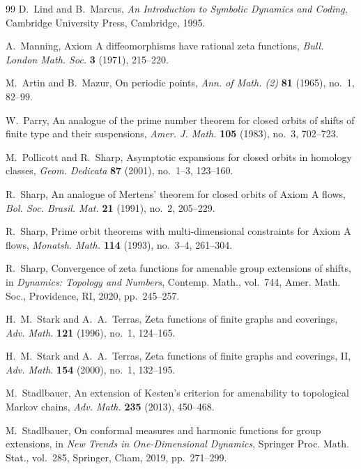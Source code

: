 \documentclass[11pt,a4paper]{amsart}
\theoremstyle{plain}
\theoremstyle{definition}
\theoremstyle{remark}
\begin{document}
\begin{thebibliography}{99}
D.~Lind and B.~Marcus,
\textit{An Introduction to Symbolic Dynamics and Coding},
Cambridge University Press, Cambridge, 1995.

A.~Manning,
Axiom {A} diffeomorphisms have rational zeta functions,
\textit{Bull. London Math. Soc.} \textbf{3} (1971), 215--220.

M.~Artin and B.~Mazur,
On periodic points,
\textit{Ann. of Math. (2)} \textbf{81} (1965), no.~1, 82--99.

W.~Parry,
An analogue of the prime number theorem for closed orbits of shifts of
finite type and their suspensions,
\textit{Amer. J. Math.} \textbf{105} (1983), no.~3, 702--723.

M.~Pollicott and R.~Sharp,
Asymptotic expansions for closed orbits in homology classes,
\textit{Geom. Dedicata} \textbf{87} (2001), no.~1--3, 123--160.

R.~Sharp,
An analogue of {M}ertens' theorem for closed orbits of {A}xiom {A} flows,
\textit{Bol. Soc. Brasil. Mat.} \textbf{21} (1991), no.~2, 205--229.

R.~Sharp,
Prime orbit theorems with multi-dimensional constraints for {A}xiom {A} flows,
\textit{Monatsh. Math.} \textbf{114} (1993), no.~3--4, 261--304.

R.~Sharp,
Convergence of zeta functions for amenable group extensions of shifts,
in \textit{Dynamics: Topology and Numbers},
Contemp. Math., vol.~744,
Amer. Math. Soc., Providence, RI, 2020, pp.~245--257.

H.~M.~Stark and A.~A.~Terras,
Zeta functions of finite graphs and coverings,
\textit{Adv. Math.} \textbf{121} (1996), no.~1, 124--165.

H.~M.~Stark and A.~A.~Terras,
Zeta functions of finite graphs and coverings, {II},
\textit{Adv. Math.} \textbf{154} (2000), no.~1, 132--195.

M.~Stadlbauer,
An extension of {K}esten's criterion for amenability to topological
{M}arkov chains,
\textit{Adv. Math.} \textbf{235} (2013), 450--468.

M.~Stadlbauer,
On conformal measures and harmonic functions for group extensions,
in \textit{New Trends in One-Dimensional Dynamics},
Springer Proc. Math. Stat., vol.~285,
Springer, Cham, 2019, pp.~271--299.


\end{thebibliography}
\end{document}
